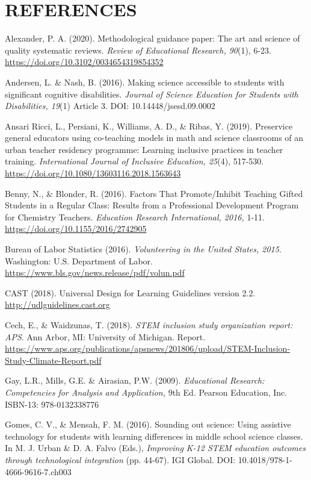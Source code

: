 \documentclass[11.5pt]{sig-alternate}
\begin{document}
\section*{REFERENCES}\par 

\leftskip 0.25in
\parindent -0.25in 

Alexander, P. A. (2020). Methodological guidance paper: The art and science of quality systematic reviews. \textit{Review of Educational Research, 90}(1), 6-23. \url{https://doi.org/10.3102/0034654319854352}

Andersen, L. \& Nash, B. (2016). Making science accessible to students with significant cognitive disabilities.  \textit{Journal of Science Education for Students with Disabilities, 19}(1) Article 3. DOI: 10.14448/jsesd.09.0002

Ansari Ricci, L., Persiani, K., Williams, A. D., \& Ribas, Y. (2019). Preservice general educators using co-teaching models in math and science classrooms of an urban teacher residency programme: Learning inclusive practices in teacher training. \textit{International Journal of Inclusive Education, 25}(4), 517-530. \url{https://doi.org/10.1080/13603116.2018.1563643}

Benny, N., \& Blonder, R. (2016). Factors That Promote/Inhibit Teaching Gifted Students in a Regular Class: Results from a Professional Development Program for Chemistry Teachers. \textit{Education Research International, 2016,} 1-11.  \url{https://doi.org/10.1155/2016/2742905} 

Bureau of Labor Statistics (2016). \textit{Volunteering in the United States, 2015}. Washington: U.S. Department of Labor. \url{https://www.bls.gov/news.release/pdf/volun.pdf} 

CAST (2018). Universal Design for Learning Guidelines version 2.2. \url{http://udlguidelines.cast.org}

Cech, E., \& Waidzunas, T. (2018). \textit{STEM inclusion study organization report: APS}. Ann Arbor, MI: University of Michigan. Report. \url{https://www.aps.org/publications/apsnews/201806/upload/STEM-Inclusion-Study-Climate-Report.pdf} 

Gay, L.R., Mills, G.E.  \& Airasian, P.W. (2009). \textit{Educational Research: Competencies for Analysis and Application,} 9th Ed. Pearson Education, Inc. ISBN-13: 978-0132338776 

Gomes, C. V., \& Mensah, F. M. (2016). Sounding out science: Using assistive technology for students with learning differences in middle school science classes. In M. J. Urban \& D. A. Falvo (Eds.),\textit{ Improving K-12 STEM education outcomes through technological integration} (pp. 44-67). IGI Global. DOI: 10.4018/978-1-4666-9616-7.ch003 
\end{document}
